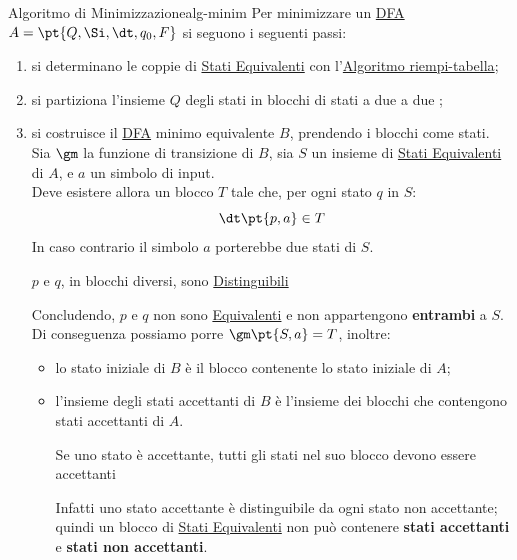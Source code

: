 \begin{remark}{Algoritmo di Minimizzazione}{alg-minim}
    Per minimizzare un \hyperref[sub:lr_dfa]{DFA} $A = \pt{Q,\Si,\dt,q_0,F}$ si seguono i seguenti passi:
    \begin{enumerate}
        \item si determinano le coppie di \hyperref[th:stati-equiv]{Stati Equivalenti} con l'\hyperref[sub:lr_algoritmo_riempi_tabella]{Algoritmo riempi-tabella};
        \item si partiziona l'insieme $Q$ degli stati in blocchi di stati a due a due ;
        \item si costruisce il \hyperref[sub:lr_dfa]{DFA} minimo equivalente $B$, prendendo i blocchi come stati.
            Sia $\gm$ la funzione di transizione di $B$, sia $S$ un insieme di \hyperref[th:stati-equiv]{Stati Equivalenti} di $A$, e $a$ un simbolo di input.
            \\
            Deve esistere allora un blocco $T$ tale che, per ogni stato $q$ in $S$:
            \[
                \dt\pt{p,a} \in T
            \]
            In caso contrario il simbolo $a$ porterebbe due stati di $S$.
            \begin{note}
                $p$ e $q$, in blocchi diversi, sono \hyperref[th:stati-distin]{Distinguibili}
            \end{note}
            Concludendo, $p$ e $q$ non sono \hyperref[th:stati-equiv]{Equivalenti} e non appartengono \textbf{entrambi} a $S$.
            \emptyln{}
            Di conseguenza possiamo porre $\gm\pt{S,a} = T$, inoltre:
            \begin{itemize}
                \item lo stato iniziale di $B$ è il blocco contenente lo stato iniziale di $A$;
                \item l'insieme degli stati accettanti di $B$ è l'insieme dei blocchi che contengono stati accettanti di $A$.
                    \begin{note}
                        Se uno stato è accettante, tutti gli stati nel suo blocco devono essere accettanti
                    \end{note}
                    Infatti uno stato accettante è distinguibile da ogni stato non accettante; quindi un blocco di \hyperref[th:stati-equiv]{Stati Equivalenti} non può contenere \textbf{stati accettanti} e \textbf{stati non accettanti}.
            \end{itemize}
    \end{enumerate}
\end{remark}
